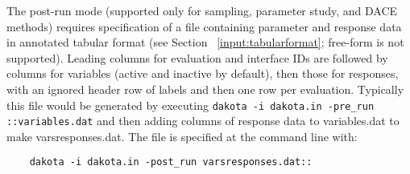 The post-run mode (supported only for sampling, parameter study, and
DACE methods) requires specification of a file containing parameter
and response data in annotated tabular format (see Section
~\ref{input:tabularformat}; free-form is not supported).  Leading
columns for evaluation and interface IDs are followed by columns for
variables (active and inactive by default), then those for responses,
with an ignored header row of labels and then one row per evaluation.
Typically this file would be generated by executing \texttt{dakota -i
  dakota.in -pre\_run ::variables.dat} and then adding columns of
response data to variables.dat to make varsresponses.dat.  The file is
specified at the command line with:
\begin{small}
\begin{verbatim}
    dakota -i dakota.in -post_run varsresponses.dat::
\end{verbatim}
\end{small}

